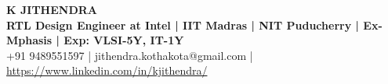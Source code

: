 \documentclass[a4paper,11pt]{article}
\begin{document}
\begin{center}
\LARGE { \uppercase {\textbf{K Jithendra}}}\\
\large \textbf{{RTL Design Engineer at Intel | IIT Madras | NIT Puducherry | Ex-Mphasis | Exp: VLSI-5Y, IT-1Y}}\\
\large {+91 9489551597 | jithendra.kothakota@gmail.com | \href{https://www.linkedin.com/in/kjithendra/}{https://www.linkedin.com/in/kjithendra/}} \\
\end{center}



\end{document}
